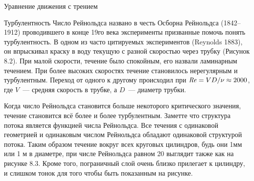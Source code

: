 \begin{chapter}{Уравнение движения с трением}
\begin{section}{Турбулентность}
Число Рейнольдса названо в честь Осборна Рейнольдса (1842--1912)
проводившего в конце 19го века эксперименты призванные помочь понять
турбулентность. В одном из часто цитируемых экспериментов (Reynolds
1883), он впрыскивал краску в воду текущую с разной скоростью через
трубку (Рисунок 8.2). При малой скорости, течение было спокойным, его
назвали ламинарным течением. При более высоких скоростях течение
становилось нерегулярным и турбулентным. Переход от одного к другому
происходил при $\text{\textit{Re}} = VD/\nu \approx 2000$, где $V$~--- средняя
скорость в трубке, а $D$~--- диаметр трубки.
%

Когда число Рейнольдса становится больше некоторого критического
значения, течение становится всё более и более турбулентным. Заметте
что структура потока является функцией числа Рейнольдса. Все течения с
одинаковой геометрией и одинаковым числом Рейнольдса обладают
одинаковой структурой потока. Таким образом течение вокруг всех
круговых цилиндров, будь они 1мм или 1 м в диаметре, при числе
Рейнольдса равном 20 выглядит также как на рисунке 8.3. Кроме того,
пограничный слой очень близко прилегает к цилиндру, и слишком тонок
для того чтобы быть показанным на рисунке.
%


\end{section}
\end{chapter}
